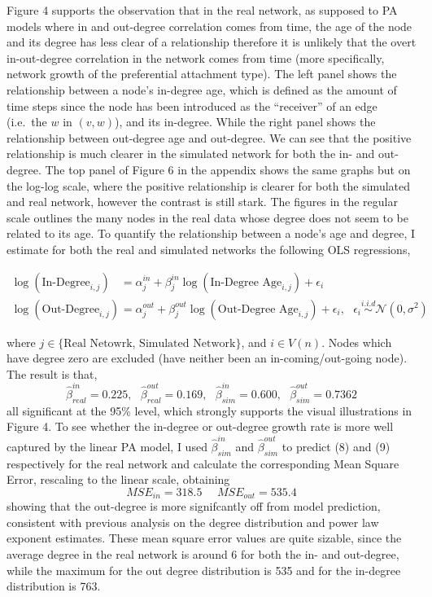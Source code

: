\documentclass[]{elsarticle} %
\begin{document}
Figure 4 supports the observation that in the real network, as supposed
to PA models where in and out-degree correlation comes from time, the
age of the node and its degree has less clear of a relationship
therefore it is unlikely that the overt in-out-degree correlation in the
network comes from time (more specifically, network growth of the
preferential attachment type). The left panel shows the relationship
between a node's in-degree age, which is defined as the amount of time
steps since the node has been introduced as the ``receiver'' of an edge
(i.e.~the \(w\) in \((v, w)\)), and its in-degree. While the right panel
shows the relationship between out-degree age and out-degree. We can see
that the positive relationship is much clearer in the simulated network
for both the in- and out-degree. The top panel of Figure 6 in the
appendix shows the same graphs but on the log-log scale, where the
positive relationship is clearer for both the simulated and real
network, however the contrast is still stark. The figures in the regular
scale outlines the many nodes in the real data whose degree does not
seem to be related to its age. To quantify the relationship between a
node's age and degree, I estimate for both the real and simulated
networks the following OLS regressions,

\begin{align}
\log(\text{In-Degree}_{i,j}) &= \alpha^{in}_{j} + \beta^{in}_{j} \log(\text{In-Degree Age}_{i,j}) + \epsilon_{i} \\
\log(\text{Out-Degree}_{i,j}) &= \alpha^{out}_{j} + \beta^{out}_{j} \log(\text{Out-Degree Age}_{i,j}) + \epsilon_{i}, \ \ \ \epsilon_{i} \overset{i.i.d}{\sim} \mathcal{N}(0, \sigma^2)
\end{align}

\noindent where \(j \in \{ \text{Real Netowrk, Simulated Network}\}\),
and \(i \in V(n)\). Nodes which have degree zero are excluded (have
neither been an in-coming/out-going node). The result is that,
\[\hat{\beta}^{in}_{real} = 0.225, \ \ \ \hat{\beta}^{out}_{real} = 0.169, \ \ \ \hat{\beta}^{in}_{sim} = 0.600, \ \ \ \hat{\beta}^{out}_{sim} = 0.7362\]
all significant at the 95\% level, which strongly supports the visual
illustrations in Figure 4. To see whether the in-degree or out-degree
growth rate is more well captured by the linear PA model, I used
\(\hat{\beta}^{in}_{sim}\) and \(\hat{\beta}^{out}_{sim}\) to predict
(8) and (9) respectively for the real network and calculate the
corresponding Mean Square Error, rescaling to the linear scale,
obtaining \[
MSE_{in} = 318.5 \ \ \ \ \ \ MSE_{out} = 535.4
\] showing that the out-degree is more signifcantly off from model
prediction, consistent with previous analysis on the degree distribution
and power law exponent estimates. These mean square error values are
quite sizable, since the average degree in the real network is around 6
for both the in- and out-degree, while the maximum for the out degree
distribution is 535 and for the in-degree distribution is 763.
\end{document}
